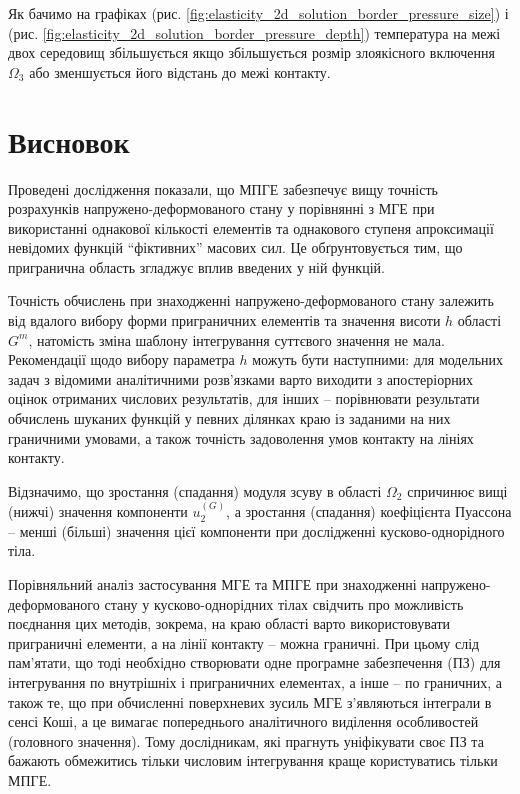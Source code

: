 Як бачимо на графіках (рис. \ref{fig:elasticity_2d_solution_border_pressure_size}) і (рис.
\ref{fig:elasticity_2d_solution_border_pressure_depth}) температура на межі двох середовищ збільшується якщо
збільшується розмір злоякісного включення $\Omega_3$ або зменшується його відстань до межі контакту.

\section{Висновок}

Проведені дослідження показали, що МПГЕ забезпечує вищу\emph{ }точність розрахунків напружено-деформованого стану у
порівнянні з МГЕ при використанні однакової кількості елементів та однакового ступеня апроксимації невідомих функцій
``фіктивних'' масових сил. Це обґрунтовується тим, що пригранична область згладжує вплив введених у ній функцій.

Точність обчислень при знаходженні напружено-деформованого стану залежить від вдалого вибору форми приграничних
елементів та значення висоти $h$ області $G^{m}$, натомість зміна шаблону інтегрування суттєвого значення не
мала. Рекомендації щодо вибору параметра $h$ можуть бути наступними: для модельних задач з відомими аналітичними
розв'язками варто виходити з апостеріорних оцінок отриманих числових результатів, для інших -- порівнювати результати
обчислень шуканих функцій у певних ділянках краю із заданими на них граничними умовами, а також точність задоволення
умов контакту на лініях контакту.

Відзначимо, що зростання (спадання) модуля зсуву в області $\Omega_{2}$ спричинює вищі (нижчі) значення компоненти
$u_{2}^{(G)}$, а зростання (спадання) коефіцієнта Пуассона -- менші (більші) значення цієї компоненти при
дослідженні кусково-однорідного тіла.

Порівняльний аналіз застосування МГЕ та МПГЕ при знаходженні напружено-деформованого стану у кусково-однорідних тілах
свідчить про можливість поєднання цих методів, зокрема, на краю області варто використовувати приграничні елементи, а на
лінії контакту -- можна граничні. При цьому слід пам'ятати, що тоді необхідно створювати одне програмне забезпечення
(ПЗ) для інтегрування по внутрішніх і приграничних елементах, а інше -- по граничних, а також те, що при обчисленні
поверхневих зусиль МГЕ з'являються інтеграли в сенсі Коші, а це вимагає попереднього аналітичного виділення особливостей
(головного значення). Тому дослідникам, які прагнуть уніфікувати своє ПЗ та бажають обмежитись тільки числовим
інтегрування краще користуватись тільки МПГЕ.

